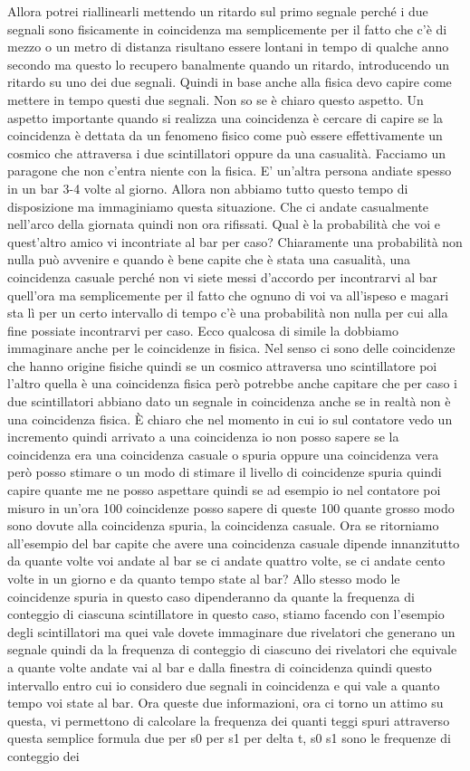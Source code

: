 {Allora potrei riallinearli mettendo un ritardo sul primo segnale perché i due segnali sono fisicamente in coincidenza ma semplicemente per il fatto che c'è di mezzo o un metro di distanza risultano essere lontani in tempo di qualche anno secondo ma questo lo recupero banalmente quando un ritardo, introducendo un ritardo su uno dei due segnali. Quindi in base anche alla fisica devo capire come mettere in tempo questi due segnali. Non so se è chiaro questo aspetto. Un aspetto importante quando si realizza una coincidenza è cercare di capire se la coincidenza è dettata da un fenomeno fisico come può essere effettivamente un cosmico che attraversa i due scintillatori oppure da una casualità. Facciamo un paragone che non c'entra niente con la fisica. E' un'altra persona andiate spesso in un bar 3-4 volte al giorno. Allora non abbiamo tutto questo tempo di disposizione ma immaginiamo questa situazione. Che ci andate casualmente nell'arco della giornata quindi non ora rifissati. Qual è la probabilità che voi e quest'altro amico vi incontriate al bar per caso? Chiaramente una probabilità non nulla può avvenire e quando è bene capite che è stata una casualità, una coincidenza casuale perché non vi siete messi d'accordo per incontrarvi al bar quell'ora ma semplicemente per il fatto che ognuno di voi va all'ispeso e magari sta lì per un certo intervallo di tempo c'è una probabilità non nulla per cui alla fine possiate incontrarvi per caso. Ecco qualcosa di simile la dobbiamo immaginare anche per le coincidenze in fisica. Nel senso ci sono delle coincidenze che hanno origine fisiche quindi se un cosmico attraversa uno scintillatore poi l'altro quella è una coincidenza fisica però potrebbe anche capitare che per caso i due scintillatori abbiano dato un segnale in coincidenza anche se in realtà non è una coincidenza fisica. È chiaro che nel momento in cui io sul contatore vedo un incremento quindi arrivato a una coincidenza io non posso sapere se la coincidenza era una coincidenza casuale o spuria oppure una coincidenza vera però posso stimare o un modo di stimare il livello di coincidenze spuria quindi capire quante me ne posso aspettare quindi se ad esempio io nel contatore poi misuro in un'ora 100 coincidenze posso sapere di queste 100 quante grosso modo sono dovute alla coincidenza spuria, la coincidenza casuale. Ora se ritorniamo all'esempio del bar capite che avere una coincidenza casuale dipende innanzitutto da quante volte voi andate al bar se ci andate quattro volte, se ci andate cento volte in un giorno e da quanto tempo state al bar? Allo stesso modo le coincidenze spuria in questo caso dipenderanno da quante la frequenza di conteggio di ciascuna scintillatore in questo caso, stiamo facendo con l'esempio degli scintillatori ma quei vale dovete immaginare due rivelatori che generano un segnale quindi da la frequenza di conteggio di ciascuno dei rivelatori che equivale a quante volte andate vai al bar e dalla finestra di coincidenza quindi questo intervallo entro cui io considero due segnali in coincidenza e qui vale a quanto tempo voi state al bar. Ora queste due informazioni, ora ci torno un attimo su questa, vi permettono di calcolare la frequenza dei quanti teggi spuri attraverso questa semplice formula due per s0 per s1 per delta t, s0 s1 sono le frequenze di conteggio dei }
